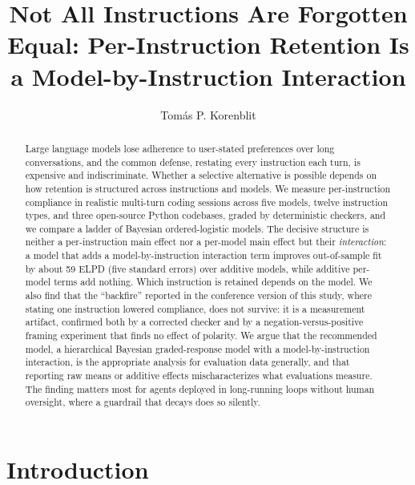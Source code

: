 \documentclass{llncs}
\begin{document}
\title{Not All Instructions Are Forgotten Equal: Per-Instruction
Retention Is a Model-by-Instruction Interaction}
\author{Tom\'as P. Korenblit}
\maketitle

\begin{abstract}
Large language models lose adherence to user-stated preferences over long
conversations, and the common defense, restating every instruction each
turn, is expensive and indiscriminate. Whether a selective alternative is
possible depends on how retention is structured across instructions and
models. We measure per-instruction compliance in realistic multi-turn
coding sessions across five models, twelve instruction types, and three
open-source Python codebases, graded by deterministic checkers, and we
compare a ladder of Bayesian ordered-logistic models. The decisive
structure is neither a per-instruction main effect nor a per-model main
effect but their \emph{interaction}: a model that adds a
model-by-instruction interaction term improves out-of-sample fit by about
59 ELPD (five standard errors) over additive models, while additive
per-model terms add nothing. Which instruction is retained depends on the
model. We also find that the ``backfire'' reported in the conference version
of this study, where stating one instruction lowered compliance, does not
survive: it is a measurement artifact, confirmed both by a corrected checker
and by a negation-versus-positive framing experiment that finds no effect of
polarity. We argue that the recommended model, a hierarchical Bayesian
graded-response model with a model-by-instruction interaction, is the
appropriate analysis for evaluation data generally, and that reporting raw
means or additive effects mischaracterizes what evaluations measure. The
finding matters most for agents deployed in long-running loops without human
oversight, where a guardrail that decays does so silently.
\end{abstract}

\section{Introduction}
\label{sec:intro}
\end{document}

